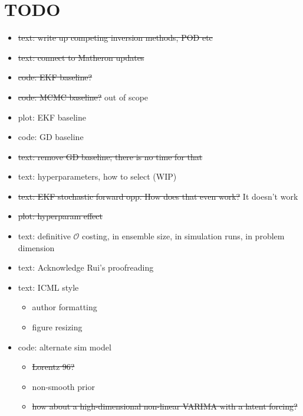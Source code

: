 \documentclass{article}
\theoremstyle{plain}
\theoremstyle{definition}
\theoremstyle{remark}
\begin{document}





\iffalse
\clearpage

\section{TODO}\label{sec:todo}
\begin{itemize}
    \item \sout{text: write up competing inversion methods, POD etc}
    \item \sout{text: connect to Matheron updates}
    \item \sout{code: EKF baseline?}
    \item \sout{code: MCMC baseline?} out of scope
    \item plot: EKF baseline
    \item code: GD baseline
    \item \sout{text: remove GD baseline; there is no time for that}
    \item text: hyperparameters, how to select (WIP)
    \item \sout{text: EKF stochastic forward opp. How does that even work?} It doesn't work
    \item \sout{plot: hyperparam effect}
    \item text: definitive \(\mathcal{O}\) costing, in ensemble size, in simulation runs, in problem dimension
    \item text: Acknowledge Rui's proofreading
    \item text: ICML style 
    \begin{itemize}
        \item author formatting
        \item figure resizing
    \end{itemize}
    \item code: alternate sim model
    \begin{itemize}
        \item \sout{Lorentz 96?}
        \item non-smooth prior
        \item \sout{how about a high-dimensional non-linear VARIMA with a latent forcing?}

\end{itemize}
\end{itemize}
\end{document}
